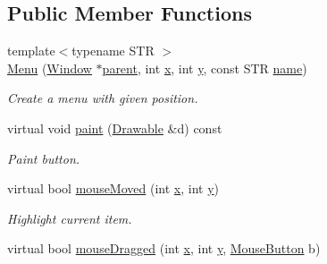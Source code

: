 \subsection*{Public Member Functions}
\begin{DoxyCompactItemize}
\item 
{\footnotesize template$<$typename S\-T\-R $>$ }\\\hyperlink{classGUI_1_1Menu_a3ad4f5a1fbc5aaf57a269a464a42c885}{Menu} (\hyperlink{classGUI_1_1Window}{Window} $\ast$\hyperlink{classGUI_1_1Window_a2e593ff65e7702178d82fe9010a0b539}{parent}, int \hyperlink{classGUI_1_1Window_a6ca6a80ca00c9e1d8ceea8d3d99a657d}{x}, int \hyperlink{classGUI_1_1Window_a0ee8e923aff2c3661fc2e17656d37adf}{y}, const S\-T\-R \hyperlink{classGUI_1_1ActionEventSource_ab494e66ccff6518e1cabe747df2173f8}{name})
\begin{DoxyCompactList}\small\item\em Create a menu with given position. \end{DoxyCompactList}\item 
\hypertarget{classGUI_1_1Menu_a731ee3b42950cc9210c4c017823c8b0c}{virtual void \hyperlink{classGUI_1_1Menu_a731ee3b42950cc9210c4c017823c8b0c}{paint} (\hyperlink{classGUI_1_1Drawable}{Drawable} \&d) const }\label{classGUI_1_1Menu_a731ee3b42950cc9210c4c017823c8b0c}

\begin{DoxyCompactList}\small\item\em Paint button. \end{DoxyCompactList}\item 
\hypertarget{classGUI_1_1Menu_a8c82c2e98eeaf6a9c232551504908ee8}{virtual bool \hyperlink{classGUI_1_1Menu_a8c82c2e98eeaf6a9c232551504908ee8}{mouse\-Moved} (int \hyperlink{classGUI_1_1Window_a6ca6a80ca00c9e1d8ceea8d3d99a657d}{x}, int \hyperlink{classGUI_1_1Window_a0ee8e923aff2c3661fc2e17656d37adf}{y})}\label{classGUI_1_1Menu_a8c82c2e98eeaf6a9c232551504908ee8}

\begin{DoxyCompactList}\small\item\em Highlight current item. \end{DoxyCompactList}\item 
\hypertarget{classGUI_1_1Menu_a35f30966e6bd112bb0e22dc157621a16}{virtual bool \hyperlink{classGUI_1_1Menu_a35f30966e6bd112bb0e22dc157621a16}{mouse\-Dragged} (int \hyperlink{classGUI_1_1Window_a6ca6a80ca00c9e1d8ceea8d3d99a657d}{x}, int \hyperlink{classGUI_1_1Window_a0ee8e923aff2c3661fc2e17656d37adf}{y}, \hyperlink{namespaceGUI_ad06082a7b02aa73697f39eb8e0856de9}{Mouse\-Button} b)}\label{classGUI_1_1Menu_a35f30966e6bd112bb0e22dc157621a16}


\end{DoxyCompactItemize}

